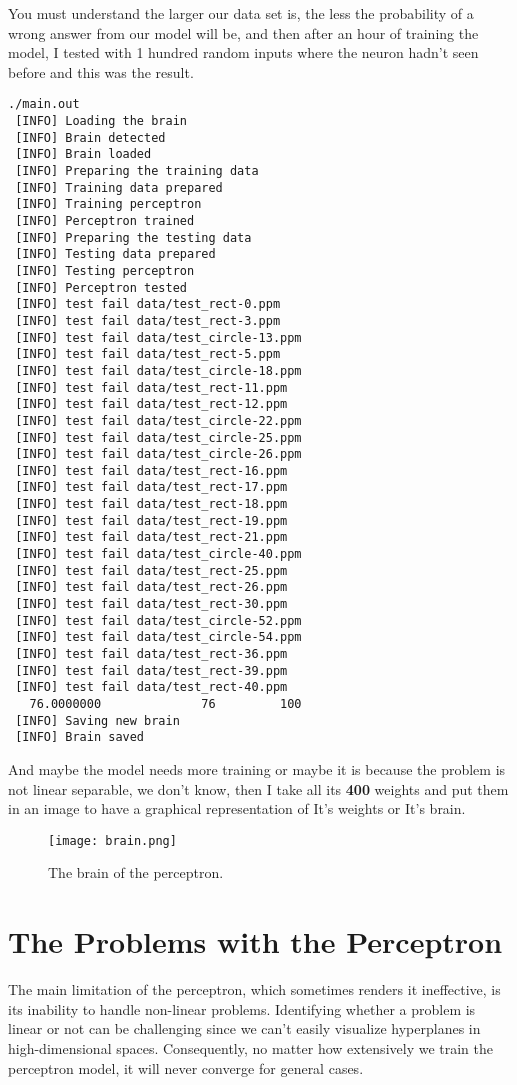 You must  understand the larger our data set is, the less the probability of a wrong answer
from our model will be, and then after an hour of training the model, I tested with 1 hundred
random inputs where the neuron hadn't seen before and this was the result.
\begin{verbatim}
./main.out
 [INFO] Loading the brain
 [INFO] Brain detected
 [INFO] Brain loaded
 [INFO] Preparing the training data
 [INFO] Training data prepared
 [INFO] Training perceptron
 [INFO] Perceptron trained
 [INFO] Preparing the testing data
 [INFO] Testing data prepared
 [INFO] Testing perceptron
 [INFO] Perceptron tested
 [INFO] test fail data/test_rect-0.ppm
 [INFO] test fail data/test_rect-3.ppm
 [INFO] test fail data/test_circle-13.ppm
 [INFO] test fail data/test_rect-5.ppm
 [INFO] test fail data/test_circle-18.ppm
 [INFO] test fail data/test_rect-11.ppm
 [INFO] test fail data/test_rect-12.ppm
 [INFO] test fail data/test_circle-22.ppm
 [INFO] test fail data/test_circle-25.ppm
 [INFO] test fail data/test_circle-26.ppm
 [INFO] test fail data/test_rect-16.ppm
 [INFO] test fail data/test_rect-17.ppm
 [INFO] test fail data/test_rect-18.ppm
 [INFO] test fail data/test_rect-19.ppm
 [INFO] test fail data/test_rect-21.ppm
 [INFO] test fail data/test_circle-40.ppm
 [INFO] test fail data/test_rect-25.ppm
 [INFO] test fail data/test_rect-26.ppm
 [INFO] test fail data/test_rect-30.ppm
 [INFO] test fail data/test_circle-52.ppm
 [INFO] test fail data/test_circle-54.ppm
 [INFO] test fail data/test_rect-36.ppm
 [INFO] test fail data/test_rect-39.ppm
 [INFO] test fail data/test_rect-40.ppm
   76.0000000              76         100
 [INFO] Saving new brain
 [INFO] Brain saved
\end{verbatim}
And maybe the model needs more training or maybe it is because the problem is not linear separable,
we don't know, then I take all its \textbf{400} weights and put them in an image to have a graphical
representation of It's weights or It's brain.
\begin{figure}[H]
  \centering
  \texttt{[image: brain.png]}
  \caption{The brain of the perceptron.}
\end{figure}

\label{sec:problems-with-the-perceptron}
\section{The Problems with the Perceptron}
The main limitation of the perceptron, which sometimes renders it ineffective, is its inability to handle
non-linear problems. Identifying whether a problem is linear or not can be challenging since we can't easily
visualize hyperplanes in high-dimensional spaces. Consequently, no matter how extensively we train the
perceptron model, it will never converge for general cases.

